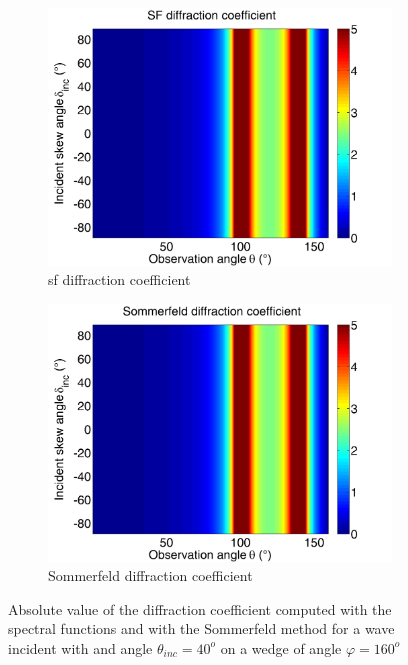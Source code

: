 \begin{figure}
\centering
\begin{subfigure}[b]{0.49\textwidth}
        \includegraphics[width=\textwidth]{images/chapter4/Xprop_160_40.png}
        \caption{\acrshort{sf} diffraction coefficient}
        \label{C4:acSF16040}
    \end{subfigure}
\begin{subfigure}[b]{0.49\textwidth}
        \includegraphics[width=\textwidth]{images/chapter4/Sommerfeld_160_40.png}
        \caption{Sommerfeld diffraction coefficient}
        \label{C4:Som16040}
    \end{subfigure}
\caption{Absolute value of the diffraction coefficient computed with the spectral functions and with the Sommerfeld method for a wave incident with and angle $\theta_{inc}=40^o$ on a wedge of angle $\varphi=160^o$}
\label{C4:ac16040}
\end{figure}

